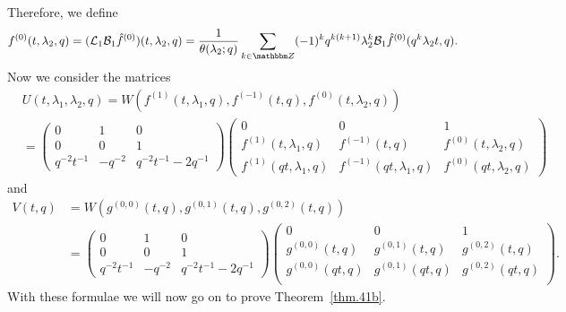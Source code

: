 \documentclass[12pt,reqno]{amsart}
\theoremstyle{definition}
\def\BZ{\mathbbm Z}
\def\be{\begin{equation}}
\def\ee{\end{equation}}
\def\Bor{\mathcal{B}}
\def\Lap{\mathcal{L}}
\begin{document}
Therefore, we define
\be\label{f0x1}
f^{(0)}(t,\lambda_{2},q)
=
(\Lap_{1}\Bor_{1}\hat{f}^{(0)})(t,\lambda_{2},q)
=
\frac{1}{\theta(\lambda_{2};q)}\sum_{k\in\BZ}(-1)^{k}q^{k(k+1)}
\lambda_{2}^{k}\Bor_{1}\hat{f}^{(0)}(q^{k}\lambda_{2}t,q).
\ee
Now we consider the matrices
\be
\label{U413}
\begin{aligned}
&U(t,\lambda_{1},\lambda_{2},q)
=
W(f^{(1)}(t,\lambda_{1},q),f^{(-1)}(t,q),f^{(0)}(t,\lambda_{2},q))\\
&=
\begin{pmatrix}
0 & 1 & 0\\
0 & 0 & 1\\
q^{-2}t^{-1} & -q^{-2} & q^{-2}t^{-1}-2q^{-1}
\end{pmatrix}
\begin{pmatrix}
0 & 0 & 1\\
f^{(1)}(t,\lambda_{1},q) & f^{(-1)}(t,q) & f^{(0)}(t,\lambda_{2},q)\\
f^{(1)}(qt,\lambda_{1},q) & f^{(-1)}(qt,\lambda_{1},q) & f^{(0)}(qt,\lambda_{2},q)
\end{pmatrix}
\end{aligned}
\ee
and
\be
\label{V413}
\begin{aligned}
V(t,q)
&=
W(g^{(0,0)}(t,q),g^{(0,1)}(t,q),g^{(0,2)}(t,q))\\
&=
\begin{pmatrix}
0 & 1 & 0\\
0 & 0 & 1\\
q^{-2}t^{-1} & -q^{-2} & q^{-2}t^{-1}-2q^{-1}
\end{pmatrix}
\begin{pmatrix}
0 & 0 & 1\\
g^{(0,0)}(t,q) & g^{(0,1)}(t,q) & g^{(0,2)}(t,q)\\
g^{(0,0)}(qt,q) & g^{(0,1)}(qt,q) & g^{(0,2)}(qt,q)\\
\end{pmatrix}.
\end{aligned}
\ee
With these formulae we will now go on to prove Theorem~\ref{thm.41b}.
\end{document}
